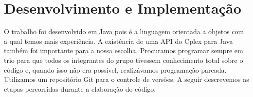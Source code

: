 
\section{Desenvolvimento e Implementação}
\label{sec:implementacao}

O trabalho foi desenvolvido em Java pois é a linguagem orientada a objetos com a qual temos mais
experiência. A existência de uma API do Cplex para Java também foi importante para a nossa escolha.
Procuramos programar sempre em trio para que todos os integrantes do grupo tivessem conhecimento
total sobre o código e, quando isso não era possível, realizávamos programação pareada. Utilizamos
um repositório Git para o controle de versões. A seguir descrevemos as etapas percorridas durante a
elaboração do código.

